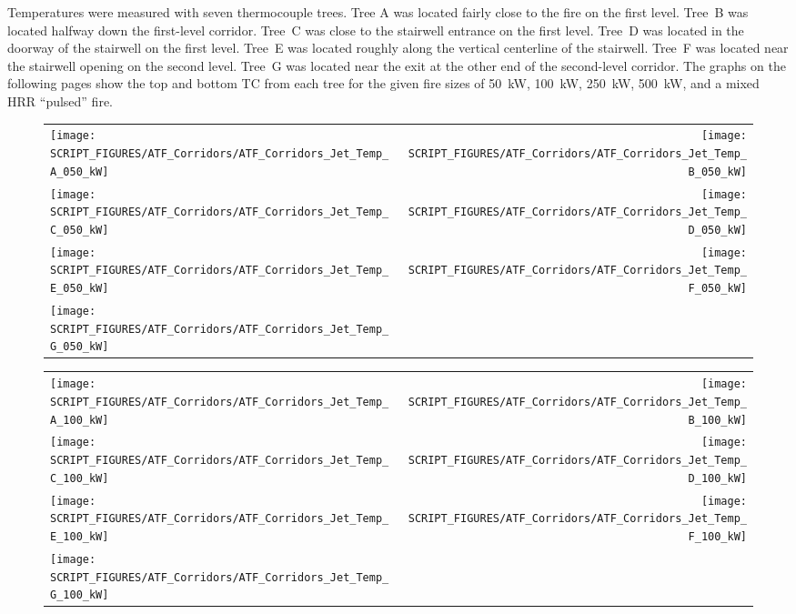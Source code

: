 Temperatures were measured with seven thermocouple trees. Tree A was located fairly close to the fire on the first level. Tree~B
was located halfway down the first-level corridor. Tree~C was close to the stairwell entrance on the first level. Tree~D was located
in the doorway of the stairwell on the first level. Tree~E was located roughly along the vertical centerline of the
stairwell. Tree~F was located near the stairwell opening on the second level. Tree~G was located near the exit at the
other end of the second-level corridor. The graphs on the following pages show the top and bottom TC from each tree for
the given fire sizes of 50~kW, 100~kW, 250~kW, 500~kW, and a mixed HRR ``pulsed'' fire.

\newpage

\begin{figure}[p]
\begin{tabular*}{\textwidth}{l@{\extracolsep{\fill}}r}
\texttt{[image: SCRIPT\_FIGURES/ATF\_Corridors/ATF\_Corridors\_Jet\_Temp\_A\_050\_kW]} &
\texttt{[image: SCRIPT\_FIGURES/ATF\_Corridors/ATF\_Corridors\_Jet\_Temp\_B\_050\_kW]} \\
\texttt{[image: SCRIPT\_FIGURES/ATF\_Corridors/ATF\_Corridors\_Jet\_Temp\_C\_050\_kW]} &
\texttt{[image: SCRIPT\_FIGURES/ATF\_Corridors/ATF\_Corridors\_Jet\_Temp\_D\_050\_kW]} \\
\texttt{[image: SCRIPT\_FIGURES/ATF\_Corridors/ATF\_Corridors\_Jet\_Temp\_E\_050\_kW]} &
\texttt{[image: SCRIPT\_FIGURES/ATF\_Corridors/ATF\_Corridors\_Jet\_Temp\_F\_050\_kW]} \\
\texttt{[image: SCRIPT\_FIGURES/ATF\_Corridors/ATF\_Corridors\_Jet\_Temp\_G\_050\_kW]} &
\end{tabular*}
\label{ATF_Corridors_Jet_Temp_50_kW}
\end{figure}

\begin{figure}[p]
\begin{tabular*}{\textwidth}{l@{\extracolsep{\fill}}r}
\texttt{[image: SCRIPT\_FIGURES/ATF\_Corridors/ATF\_Corridors\_Jet\_Temp\_A\_100\_kW]} &
\texttt{[image: SCRIPT\_FIGURES/ATF\_Corridors/ATF\_Corridors\_Jet\_Temp\_B\_100\_kW]} \\
\texttt{[image: SCRIPT\_FIGURES/ATF\_Corridors/ATF\_Corridors\_Jet\_Temp\_C\_100\_kW]} &
\texttt{[image: SCRIPT\_FIGURES/ATF\_Corridors/ATF\_Corridors\_Jet\_Temp\_D\_100\_kW]} \\
\texttt{[image: SCRIPT\_FIGURES/ATF\_Corridors/ATF\_Corridors\_Jet\_Temp\_E\_100\_kW]} &
\texttt{[image: SCRIPT\_FIGURES/ATF\_Corridors/ATF\_Corridors\_Jet\_Temp\_F\_100\_kW]} \\
\texttt{[image: SCRIPT\_FIGURES/ATF\_Corridors/ATF\_Corridors\_Jet\_Temp\_G\_100\_kW]} &
\end{tabular*}
\label{ATF_Corridors_Jet_Temp_100_kW}
\end{figure}

